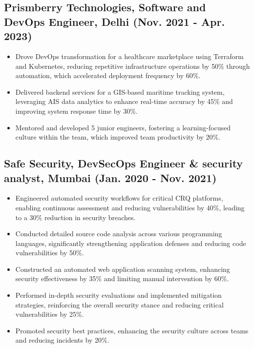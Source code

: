 \documentclass[a4paper,9pt]{article}
\begin{document}
\subsection*{Prismberry Technologies, Software and DevOps Engineer, Delhi (Nov. 2021 - Apr. 2023)}
\begin{itemize}
    \item Drove DevOps transformation for a healthcare marketplace using Terraform and Kubernetes, reducing repetitive infrastructure operations by 50\% through automation, which accelerated deployment frequency by 60\%.
    \item Delivered backend services for a GIS-based maritime tracking system, leveraging AIS data analytics to enhance real-time accuracy by 45\% and improving system response time by 30\%.
    \item Mentored and developed 5 junior engineers, fostering a learning-focused culture within the team, which improved team productivity by 20\%.
\end{itemize}

\subsection*{Safe Security, DevSecOps Engineer & security analyst, Mumbai (Jan. 2020 - Nov. 2021)}
\begin{itemize}
    \item Engineered automated security workflows for critical CRQ platforms, enabling continuous assessment and reducing vulnerabilities by 40\%, leading to a 30\% reduction in security breaches.
    \item Conducted detailed source code analysis across various programming languages, significantly strengthening application defenses and reducing code vulnerabilities by 50\%.
    \item Constructed an automated web application scanning system, enhancing security effectiveness by 35\% and limiting manual intervention by 60\%.
    \item Performed in-depth security evaluations and implemented mitigation strategies, reinforcing the overall security stance and reducing critical vulnerabilities by 25\%.
    \item Promoted security best practices, enhancing the security culture across teams and reducing incidents by 20\%.
\end{itemize}
\end{document}

